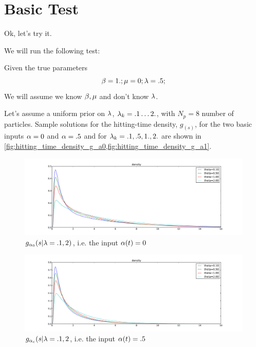 \documentclass{article}
\begin{document}
\section{Basic Test}
Ok, let's try it.

We will run the following test:

Given the true parameters
$$
{\beta} = 1.; {\mu } = 0; {\lambda} = .5;
$$
We will assume we know ${\beta}, {\mu }$ and don't know ${\lambda}$.
 
Let's assume a uniform prior on ${\lambda}$, ${\lambda}_k = .1\dots 2.$, with $N_p = 8$
number of particles. Sample solutions for the hitting-time density,
$g_(s)$, for the two basic inputs ${\alpha} = 0$ and ${\alpha} = .5$ and for ${\lambda}_k = .1, .5,
1., 2.$ are shown in \cref{fig:hitting_time_density_g_a0,fig:hitting_time_density_g_a1}.

\begin{figure}[htp] 
\begin{center}
  \includegraphics[width=1\textwidth]{Figs/ForwardSolver/test_alpha_0.pdf}
  \caption[labelInTOC]{$g_{{\alpha}_0}(s|{\lambda}=.1,2)$, i.e. the input ${\alpha}(t) = 0$}
  \label{fig:hitting_time_density_g_a0}
\end{center}
\end{figure}  

\begin{figure}[htp]
\begin{center}
  \includegraphics[width=1\textwidth]{Figs/ForwardSolver/test_alpha_crit.pdf}
  \caption[labelInTOC]{$g_{{\alpha}_c}(s|{\lambda}=.1,2$, i.e. the input ${\alpha}(t) = .5$}
  \label{fig:hitting_time_density_g_a1}
\end{center}
\end{figure} 
\end{document}
